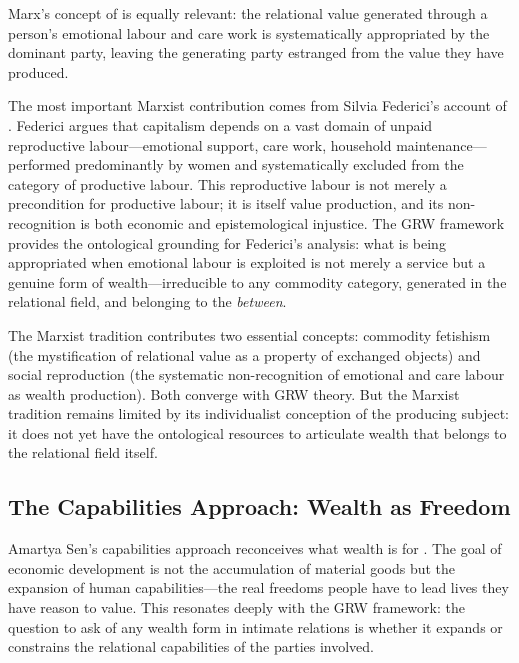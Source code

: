 Marx's concept of  is equally relevant: the relational value generated through a person's emotional labour and care work is systematically appropriated by the dominant party, leaving the generating party estranged from the value they have produced.

The most important Marxist contribution comes from Silvia Federici's account of  \parencite{federici2004}. Federici argues that capitalism depends on a vast domain of unpaid reproductive labour---emotional support, care work, household maintenance---performed predominantly by women and systematically excluded from the category of productive labour. This reproductive labour is not merely a precondition for productive labour; it is itself value production, and its non-recognition is both economic and epistemological injustice. The GRW framework provides the ontological grounding for Federici's analysis: what is being appropriated when emotional labour is exploited is not merely a service but a genuine form of wealth---irreducible to any commodity category, generated in the relational field, and belonging to the \emph{between}.

\begin{claim}
The Marxist tradition contributes two essential concepts: commodity fetishism (the mystification of relational value as a property of exchanged objects) and social reproduction (the systematic non-recognition of emotional and care labour as wealth production). Both converge with GRW theory. But the Marxist tradition remains limited by its individualist conception of the producing subject: it does not yet have the ontological resources to articulate wealth that belongs to the relational field itself.
\end{claim}

\subsection{The Capabilities Approach: Wealth as Freedom}
\label{p15:subsec:capabilities}

\noindent
Amartya Sen's capabilities approach reconceives what wealth is for \parencite{sen1999}. The goal of economic development is not the accumulation of material goods but the expansion of human capabilities---the real freedoms people have to lead lives they have reason to value. This resonates deeply with the GRW framework: the question to ask of any wealth form in intimate relations is whether it expands or constrains the relational capabilities of the parties involved.

